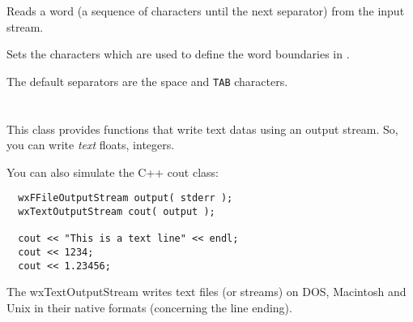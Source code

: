 \label{wxtextinputstreamreadword}


Reads a word (a sequence of characters until the next separator) from the
input stream.




\label{wxtextinputstreamsetstringseparators}


Sets the characters which are used to define the word boundaries in 
.

The default separators are the space and {\tt TAB} characters.


\section{}\label{wxtextoutputstream}

This class provides functions that write text datas using an output stream.
So, you can write {\it text} floats, integers.

You can also simulate the C++ cout class:

\begin{verbatim}
  wxFFileOutputStream output( stderr );
  wxTextOutputStream cout( output );

  cout << "This is a text line" << endl;
  cout << 1234;
  cout << 1.23456;
\end{verbatim}

The wxTextOutputStream writes text files (or streams) on DOS, Macintosh
and Unix in their native formats (concerning the line ending).



\label{wxtextoutputstreamctor}


